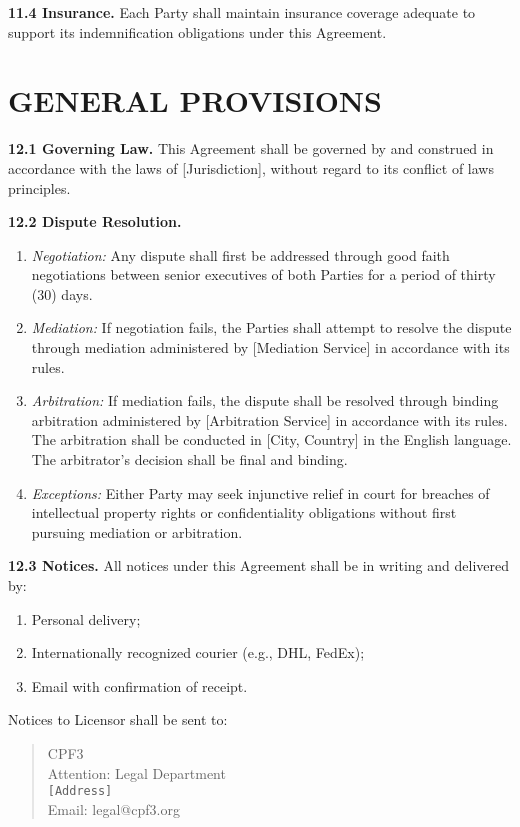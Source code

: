 \documentclass[11pt,a4paper]{article}
\begin{document}
\textbf{11.4 Insurance.} Each Party shall maintain insurance coverage adequate to support its indemnification obligations under this Agreement.

\section{GENERAL PROVISIONS}

\textbf{12.1 Governing Law.} This Agreement shall be governed by and construed in accordance with the laws of [Jurisdiction], without regard to its conflict of laws principles.

\textbf{12.2 Dispute Resolution.}

\begin{enumerate}[label=\alph*)]
\item \textit{Negotiation:} Any dispute shall first be addressed through good faith negotiations between senior executives of both Parties for a period of thirty (30) days.
\item \textit{Mediation:} If negotiation fails, the Parties shall attempt to resolve the dispute through mediation administered by [Mediation Service] in accordance with its rules.
\item \textit{Arbitration:} If mediation fails, the dispute shall be resolved through binding arbitration administered by [Arbitration Service] in accordance with its rules. The arbitration shall be conducted in [City, Country] in the English language. The arbitrator's decision shall be final and binding.
\item \textit{Exceptions:} Either Party may seek injunctive relief in court for breaches of intellectual property rights or confidentiality obligations without first pursuing mediation or arbitration.
\end{enumerate}

\textbf{12.3 Notices.} All notices under this Agreement shall be in writing and delivered by:

\begin{enumerate}[label=\alph*)]
\item Personal delivery;
\item Internationally recognized courier (e.g., DHL, FedEx);
\item Email with confirmation of receipt.
\end{enumerate}

Notices to Licensor shall be sent to:
\begin{quote}
CPF3\\
Attention: Legal Department\\
\texttt{[Address]}\\ 
Email: legal@cpf3.org
\end{quote}
\end{document}
